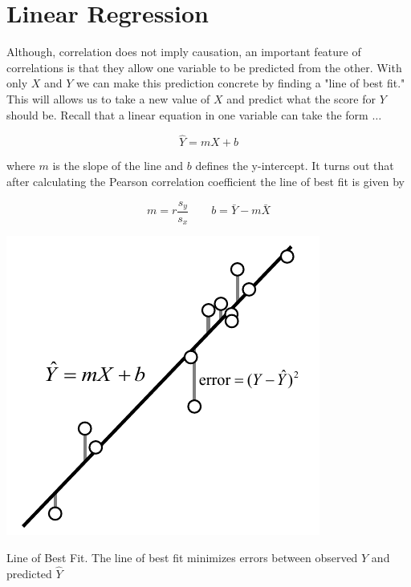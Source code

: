 \documentclass{tufte-handout}
\begin{document}
\section{Linear Regression}

Although, correlation does not imply causation, an important feature of correlations is that they allow one variable to be predicted from the other. With only $X$ and $Y$ we can make this prediction concrete by finding a "line of best fit." This will allows us to take a new value of $X$ and predict what the score for $Y$ should be. Recall that a linear equation in one variable can take the form $\dots$

\begin{equation*}
\hat{Y}=mX+b
\end{equation*}

where $m$ is the slope of the line and $b$ defines the y-intercept. It turns out that after calculating the Pearson correlation coefficient the line of best fit is given by

\begin{equation*}
m=r\frac{s_y}{s_x} \qquad b=\bar{Y}-m\bar{X}
\end{equation*}


\begin{marginfigure}[10pt]
  \includegraphics[width=\linewidth]{images/handout8_bestfit}%
  \label{fig:fullfig}%
\caption{Line of Best Fit. The line of best fit minimizes errors between observed $Y$ and predicted $\hat{Y}$}
\end{marginfigure}
\end{document}
